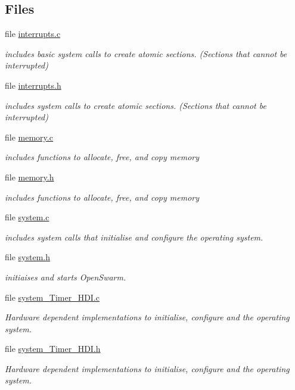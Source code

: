 \subsection*{Files}
\begin{DoxyCompactItemize}
\item 
file \hyperlink{interrupts_8c}{interrupts.\+c}
\begin{DoxyCompactList}\small\item\em includes basic system calls to create atomic sections. (Sections that cannot be interrupted) \end{DoxyCompactList}\item 
file \hyperlink{interrupts_8h}{interrupts.\+h}
\begin{DoxyCompactList}\small\item\em includes system calls to create atomic sections. (Sections that cannot be interrupted) \end{DoxyCompactList}\item 
file \hyperlink{memory_8c}{memory.\+c}
\begin{DoxyCompactList}\small\item\em includes functions to allocate, free, and copy memory \end{DoxyCompactList}\item 
file \hyperlink{memory_8h}{memory.\+h}
\begin{DoxyCompactList}\small\item\em includes functions to allocate, free, and copy memory \end{DoxyCompactList}\item 
file \hyperlink{system_8c}{system.\+c}
\begin{DoxyCompactList}\small\item\em includes system calls that initialise and configure the operating system. \end{DoxyCompactList}\item 
file \hyperlink{system_8h}{system.\+h}
\begin{DoxyCompactList}\small\item\em initiaises and starts Open\+Swarm. \end{DoxyCompactList}\item 
file \hyperlink{system__Timer__HDI_8c}{system\+\_\+\+Timer\+\_\+\+H\+D\+I.\+c}
\begin{DoxyCompactList}\small\item\em Hardware dependent implementations to initialise, configure and the operating system. \end{DoxyCompactList}\item 
file \hyperlink{system__Timer__HDI_8h}{system\+\_\+\+Timer\+\_\+\+H\+D\+I.\+h}
\begin{DoxyCompactList}\small\item\em Hardware dependent implementations to initialise, configure and the operating system. \end{DoxyCompactList}\end{DoxyCompactItemize}


